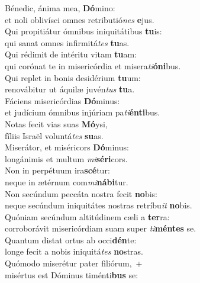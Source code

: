 \evenverse Bénedic, ánima mea, \textbf{Dó}mino:~\*\\
\evenverse et noli oblivísci omnes retributió\textit{nes} \textbf{e}jus.\\
\oddverse Qui propitiátur ómnibus iniquitátibus \textbf{tu}is:~\*\\
\oddverse qui sanat omnes infirmitá\textit{tes} \textbf{tu}as.\\
\evenverse Qui rédimit de intéritu vitam \textbf{tu}am:~\*\\
\evenverse qui corónat te in misericórdia et misera\textit{ti}\textbf{ó}\textbf{ni}bus.\\
\oddverse Qui replet in bonis desidérium \textbf{tu}um:~\*\\
\oddverse renovábitur ut áquilæ juvén\textit{tus} \textbf{tu}a.\\
\evenverse Fáciens misericórdias \textbf{Dó}minus:~\*\\
\evenverse et judícium ómnibus injúriam pa\textit{ti}\textbf{én}\textbf{ti}bus.\\
\oddverse Notas fecit vias suas \textbf{Mó}ysi,~\*\\
\oddverse fíliis Israël voluntá\textit{tes} \textbf{su}as.\\
\evenverse Miserátor, et miséricors \textbf{Dó}minus:~\*\\
\evenverse longánimis et multum \textit{mi}\textbf{sé}\textbf{ri}cors.\\
\oddverse Non in perpétuum ira\textbf{scé}tur:~\*\\
\oddverse neque in ætérnum com\textit{mi}\textbf{ná}\textbf{bi}tur.\\
\evenverse Non secúndum peccáta nostra fecit \textbf{no}bis:~\*\\
\evenverse neque secúndum iniquitátes nostras retríbu\textit{it} \textbf{no}bis.\\
\oddverse Quóniam secúndum altitúdinem cæli a \textbf{ter}ra:~\*\\
\oddverse corroborávit misericórdiam suam super \textit{ti}\textbf{mén}\textbf{tes} se.\\
\evenverse Quantum distat ortus ab occi\textbf{dén}te:~\*\\
\evenverse longe fecit a nobis iniquitá\textit{tes} \textbf{no}stras.\\
\oddverse Quómodo miserétur pater filiórum,~+\\
\oddverse  misértus est Dóminus timénti\textbf{bus} se:~\*\\
